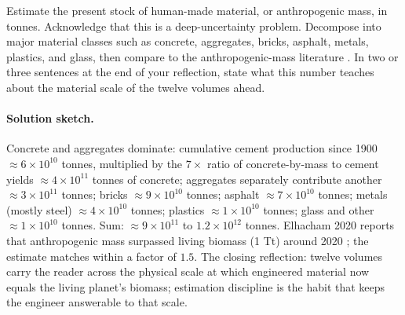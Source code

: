 \begin{exercise}
Estimate the present stock of human-made material, or anthropogenic
mass, in tonnes. Acknowledge that this is a deep-uncertainty problem.
Decompose into major material classes such as concrete, aggregates,
bricks, asphalt, metals, plastics, and glass, then compare to the
anthropogenic-mass literature \cite{paper:elhacham2020-anthropogenic-mass}.
In two or three sentences at the end of your reflection, state what
this number teaches about the material scale of the twelve volumes
ahead.
\end{exercise}

\paragraph{Solution sketch.}
Concrete and aggregates dominate: cumulative cement production
since 1900 $\approx 6 \times 10^{10}$ tonnes, multiplied by the
$7\times$ ratio of concrete-by-mass to cement yields $\approx
4 \times 10^{11}$ tonnes of concrete; aggregates separately
contribute another $\approx 3 \times 10^{11}$ tonnes; bricks
$\approx 9 \times 10^{10}$ tonnes; asphalt $\approx 7 \times
10^{10}$ tonnes; metals (mostly steel) $\approx 4 \times 10^{10}$
tonnes; plastics $\approx 1 \times 10^{10}$ tonnes; glass and
other $\approx 1 \times 10^{10}$ tonnes. Sum: $\approx 9 \times
10^{11}$ to $1.2 \times 10^{12}$ tonnes. Elhacham 2020 reports
that anthropogenic mass surpassed living biomass (1 Tt) around
2020 \cite{paper:elhacham2020-anthropogenic-mass}; the estimate
matches within a factor of $1.5$. The closing reflection:
twelve volumes carry the reader across the physical scale at
which engineered material now equals the living planet's
biomass; estimation discipline is the habit that keeps the
engineer answerable to that scale.
